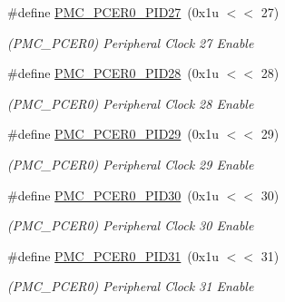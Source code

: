 \begin{DoxyCompactItemize}
\mbox{\label{group__SAMV71__PMC_ga8e4d278157b4876dfae3a3219188c267}} 
\#define \mbox{\hyperlink{group__SAMV71__PMC_ga8e4d278157b4876dfae3a3219188c267}{P\+M\+C\+\_\+\+P\+C\+E\+R0\+\_\+\+P\+I\+D27}}~(0x1u $<$$<$ 27)
\begin{DoxyCompactList}\small\item\em (P\+M\+C\+\_\+\+P\+C\+E\+R0) Peripheral Clock 27 Enable \end{DoxyCompactList}\item 
\mbox{\label{group__SAMV71__PMC_ga3941f6eb675de75097b0324b62f6f23f}} 
\#define \mbox{\hyperlink{group__SAMV71__PMC_ga3941f6eb675de75097b0324b62f6f23f}{P\+M\+C\+\_\+\+P\+C\+E\+R0\+\_\+\+P\+I\+D28}}~(0x1u $<$$<$ 28)
\begin{DoxyCompactList}\small\item\em (P\+M\+C\+\_\+\+P\+C\+E\+R0) Peripheral Clock 28 Enable \end{DoxyCompactList}\item 
\mbox{\label{group__SAMV71__PMC_ga9427ce030d0f8e9f86f64bf9678422e3}} 
\#define \mbox{\hyperlink{group__SAMV71__PMC_ga9427ce030d0f8e9f86f64bf9678422e3}{P\+M\+C\+\_\+\+P\+C\+E\+R0\+\_\+\+P\+I\+D29}}~(0x1u $<$$<$ 29)
\begin{DoxyCompactList}\small\item\em (P\+M\+C\+\_\+\+P\+C\+E\+R0) Peripheral Clock 29 Enable \end{DoxyCompactList}\item 
\mbox{\label{group__SAMV71__PMC_ga6cf8e6dd627939d699ac9d52591d07b1}} 
\#define \mbox{\hyperlink{group__SAMV71__PMC_ga6cf8e6dd627939d699ac9d52591d07b1}{P\+M\+C\+\_\+\+P\+C\+E\+R0\+\_\+\+P\+I\+D30}}~(0x1u $<$$<$ 30)
\begin{DoxyCompactList}\small\item\em (P\+M\+C\+\_\+\+P\+C\+E\+R0) Peripheral Clock 30 Enable \end{DoxyCompactList}\item 
\mbox{\label{group__SAMV71__PMC_ga6610934096cd9e4f8a23008eaf04cd14}} 
\#define \mbox{\hyperlink{group__SAMV71__PMC_ga6610934096cd9e4f8a23008eaf04cd14}{P\+M\+C\+\_\+\+P\+C\+E\+R0\+\_\+\+P\+I\+D31}}~(0x1u $<$$<$ 31)
\begin{DoxyCompactList}\small\item\em (P\+M\+C\+\_\+\+P\+C\+E\+R0) Peripheral Clock 31 Enable \end{DoxyCompactList}\item 
$$
\end{DoxyCompactItemize}
